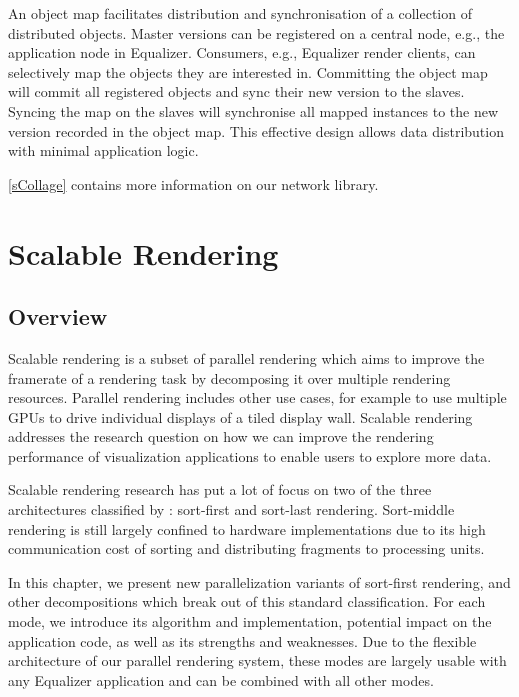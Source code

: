 An object map facilitates distribution and synchronisation of a collection of
distributed objects. Master versions can be registered on a central node, e.g.,
the application node in \textsf{Equalizer}. Consumers, e.g., \textsf{Equalizer}
render clients, can selectively map the objects they are interested in.
Committing the object map will commit all registered objects and sync their new
version to the slaves. Syncing the map on the slaves will synchronise all mapped
instances to the new version recorded in the object map. This effective design
allows data distribution with minimal application logic.

\cref{sCollage} contains more information on our network library.

\chapter{Scalable Rendering}\label{sScalable}

\section{Overview}

Scalable rendering is a subset of parallel rendering which aims to improve the
framerate of a rendering task by decomposing it over multiple rendering
resources. Parallel rendering includes other use cases, for example to use
multiple GPUs to drive individual displays of a tiled display wall. Scalable rendering addresses the research question on how we can improve the rendering performance of visualization applications to enable users to explore more data.

Scalable rendering research has put a lot of focus on two of the three
architectures classified by \cite{Molnar92}: sort-first and sort-last rendering.
Sort-middle rendering is still largely confined to hardware implementations due
to its high communication cost of sorting and distributing fragments to
processing units.

In this chapter, we present new parallelization variants of sort-first
rendering, and other decompositions which break out of this standard
classification. For each mode, we introduce its algorithm and implementation,
potential impact on the application code, as well as its strengths and
weaknesses. Due to the flexible architecture of our parallel rendering system,
these modes are largely usable with any Equalizer application and can be
combined with all other modes.

